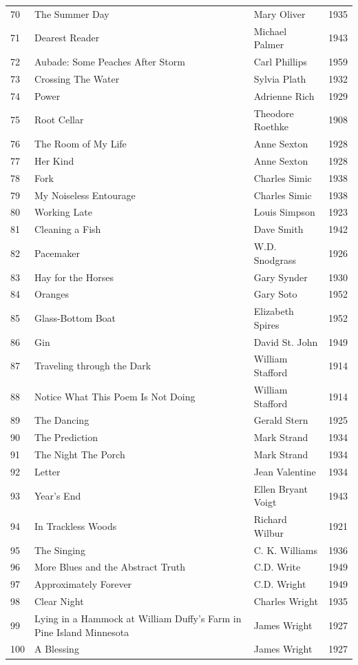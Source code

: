 \documentclass{book}
\begin{document}
\begin{table}[h!]
\begin{tabular}{llll}
70 & The Summer Day & Mary Oliver & 1935 \\
71 & Dearest Reader & Michael Palmer & 1943 \\
72 & Aubade: Some Peaches After Storm & Carl Phillips & 1959 \\
73 & Crossing The Water & Sylvia Plath & 1932 \\
74 & Power & Adrienne Rich & 1929 \\
75 & Root Cellar & Theodore Roethke & 1908 \\
76 & The Room of My Life & Anne Sexton & 1928 \\
77 & Her Kind & Anne Sexton & 1928 \\
78 & Fork & Charles Simic & 1938 \\
79 & My Noiseless Entourage & Charles Simic & 1938 \\
80 & Working Late & Louis Simpson & 1923 \\
81 & Cleaning a Fish & Dave Smith & 1942 \\
82 & Pacemaker & W.D. Snodgrass & 1926 \\
83 & Hay for the Horses & Gary Synder & 1930 \\
84 & Oranges & Gary Soto & 1952 \\
85 & Glass-Bottom Boat & Elizabeth Spires & 1952 \\
86 & Gin & David St. John & 1949 \\
87 & Traveling through the Dark & William Stafford & 1914 \\
88 & Notice What This Poem Is Not Doing & William Stafford & 1914 \\
89 & The Dancing & Gerald Stern & 1925 \\
90 & The Prediction & Mark Strand & 1934 \\
91 & The Night The Porch & Mark Strand & 1934 \\
92 & Letter & Jean Valentine & 1934 \\
93 & Year's End & Ellen Bryant Voigt & 1943 \\
94 & In Trackless Woods & Richard Wilbur & 1921 \\
95 & The Singing & C. K. Williams & 1936 \\
96 & More Blues and the Abstract Truth & C.D. Write & 1949 \\
97 & Approximately Forever & C.D. Wright & 1949 \\
98 & Clear Night & Charles Wright & 1935 \\
99 & Lying in a Hammock at William Duffy's Farm in Pine Island Minnesota & James Wright & 1927 \\
100 & A Blessing & James Wright & 1927 \\
\bottomrule
\end{tabular}
\end{table}
\end{document}
